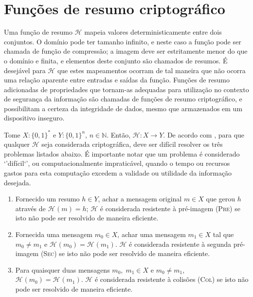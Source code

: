\documentclass[12pt]{report}
\newcommand{\hh}{$\mathcal{H}$}
\newcommand{\hash}[2][]{\mathcal{H}^{#1}(#2)}
\newcommand{\binwds}[1]{\{0, 1\}^{#1}}
\begin{document}
\section{Funções de resumo criptográfico}

Uma função de resumo \hh{} mapeia valores deterministicamente entre dois
conjuntos. O domínio pode ter tamanho infinito, e neste caso a função pode ser
chamada de função de compressão; a imagem deve ser estritamente menor do que o
domínio e finita, e elementos deste conjunto são chamados de resumos. É
desejável para \hh{} que estes mapeamentos ocorram de tal maneira que não
ocorra uma relação aparente entre entradas e saídas da função. Funções de
resumo adicionadas de propriedades que tornam-as adequadas para utilização no
contexto de segurança da informação são chamadas de funções de resumo
criptográfico, e possibilitam a certeza da integridade de dados, mesmo que
armazenados em um dispositivo inseguro.

Tome $X : \binwds{*}$ e $Y : \binwds{n}$, $n \in \mathbb{N}$. Então,
$\mathcal{H} : X \longrightarrow Y$. De acordo com
\cite{stinson2005cryptography}, para que qualquer \hh{} seja considerada
criptográfica, deve ser difícil resolver os três problemas listados abaixo.
É importante notar que um problema é considerado `'difícil`', ou
computacionalmente impraticável, quando o tempo ou recursos gastos para esta
computação excedem a validade ou utilidade da informação desejada.

\begin{enumerate}[label=\roman*.]

  \item Fornecido um resumo $h \in Y$, achar a mensagem original $m \in X$ que
    gerou $h$ através de $\hash{m} = h$; \hh{} é considerada resistente à
    pré-imagem (\textsc{Pre}) se isto não pode ser resolvido de maneira
    eficiente.

  \item Fornecida uma mensagem $m_0 \in X$, achar uma mensagem $m_1 \in X$ tal
    que $m_0 \neq m_1$ e $\hash{m_0} = \hash{m_1}$. \hh{} é considerada
    resistente à segunda pré-imagem (\textsc{Sec}) se isto não pode ser
    resolvido de maneira eficiente.

  \item Para quaisquer duas mensagens $m_0, \; m_1 \in X$ e $m_0 \neq m_1$,
    $\hash{m_0} = \hash{m_1}$. \hh{} é considerada resistente à colisões
    (\textsc{Col}) se isto não pode ser resolvido de maneira eficiente.

\end{enumerate}
\end{document}
